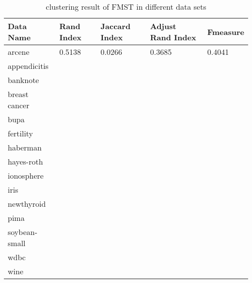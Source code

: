		\begin{table}[htb]
	      \centering
	      \caption{clustering result of FMST in different data sets}
	      \label{my-label}
	      \begin{tabular}{|lllll|}
	        \hline
	         Data Name & Rand Index  & Jaccard Index  & Adjust Rand Index & F\-measure  \\ \hline
	         arcene         & 0.5138 & 0.0266 & 0.3685 & 0.4041  \\ 
	         appendicitis   &  & &  &  \\ 
	         banknote       &  & &  &  \\ 
	         breast cancer  &  & &  & \\ 
	         bupa           &  & &  &  \\ 
	         fertility      &  & &  & \\ 
	         haberman       &  & &  &  \\ 
	         hayes-roth     &  & &  & \\ 
	         ionosphere     &  & &  &  \\ 
	         iris           &  & &  & \\ 
	         newthyroid     &  & &  &  \\ 
	         pima           &  & &  & \\ 
	         soybean-small  &  & &  & \\ 
	         wdbc           &  & &  & \\ 
	         wine           &  & &  &  \\ 
	         \hline
	      \end{tabular}
	    \end{table} 

